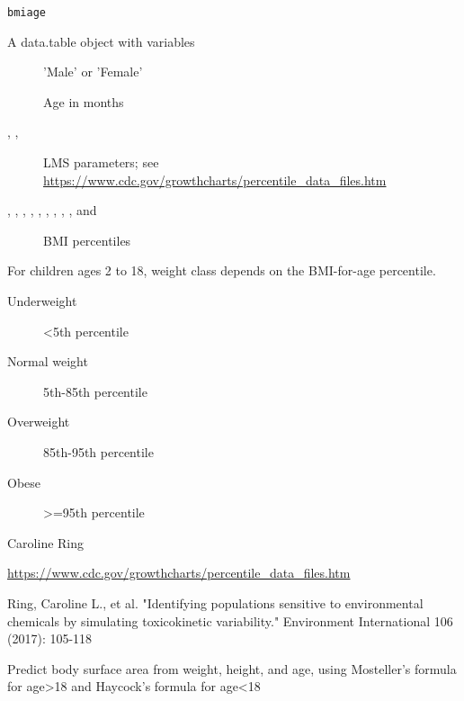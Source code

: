 \documentclass[a4paper]{book}
\begin{document}
%
\begin{Usage}
\begin{verbatim}
bmiage
\end{verbatim}
\end{Usage}
%
\begin{Format}
A data.table object with variables \begin{description}

\item[] 'Male' or 'Female'
\item[] Age in months
\item[,
, ] LMS parameters; see
\url{https://www.cdc.gov/growthcharts/percentile_data_files.htm}
\item[,
, , , , , ,
, , and ] BMI percentiles
\end{description}

\end{Format}
%
\begin{Details}\relax
For children ages 2 to 18, weight class depends on the BMI-for-age percentile.
\begin{description}

\item[Underweight] <5th percentile
\item[Normal weight] 5th-85th percentile
\item[Overweight] 85th-95th percentile
\item[Obese] >=95th percentile

\end{description}

\end{Details}
%
\begin{Author}\relax
Caroline Ring
\end{Author}
%
\begin{Source}\relax
\url{https://www.cdc.gov/growthcharts/percentile_data_files.htm}
\end{Source}
%
\begin{References}\relax
Ring, Caroline L., et al. "Identifying populations sensitive to
environmental chemicals by simulating toxicokinetic variability." Environment
International 106 (2017): 105-118
\end{References}
%
\begin{Description}\relax
Predict body surface area from weight, height, and age, using Mosteller's
formula for age>18 and Haycock's formula for age<18
\end{Description}
\end{document}
